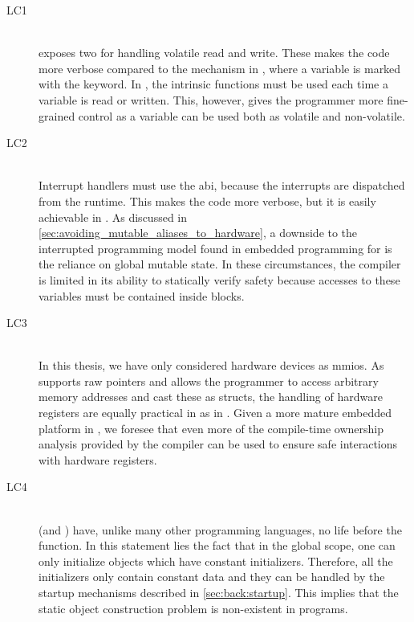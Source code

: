 \begin{description}
\item [LC1 {\lci}] \hfill \\
  {\rust} exposes two  for handling volatile read and write.
  These makes the code more verbose compared to the mechanism in {\C}, where a variable is marked with the  keyword.
  In {\rust}, the intrinsic functions must be used each time a variable is read or written.
  This, however, gives the programmer more fine-grained control as a variable can be used both as volatile and non-volatile.

\item [LC2 {\lcii}] \hfill \\
  Interrupt handlers must use the {\C} \gls{abi}, because the interrupts are dispatched from the {\C} runtime.
  This makes the code more verbose, but it is easily achievable in {\rust}.
  As discussed in \autoref{sec:avoiding_mutable_aliases_to_hardware}, a downside to the interrupted programming model found in embedded programming for {\rust} is the reliance on global mutable state.
  In these circumstances, the compiler is limited in its ability to statically verify safety because accesses to these variables must be contained inside {\unsafe} blocks.

\item [LC3 {\lciii}] \hfill \\
  In this thesis, we have only considered hardware devices as \glspl{mmio}.
  As {\rust} supports raw pointers and allows the programmer to access arbitrary memory addresses and cast these as structs, the handling of hardware registers are equally practical in {\rust} as in {\C}.
  Given a more mature embedded platform in {\rust}, we foresee that even more of the compile-time ownership analysis provided by the {\rust} compiler can be used to ensure safe interactions with hardware registers.

\item [LC4 {\lciv}] \hfill \\
  {\rust} (and {\C}) have, unlike many other programming languages, no life before the {\main} function.
  In this statement lies the fact that in the global scope, one can only initialize objects which have constant initializers.
  Therefore, all the initializers only contain constant data and they can be handled by the startup mechanisms described in \autoref{sec:back:startup}.
  This implies that the static object construction problem is non-existent in {\rust} programs.


\end{description}
